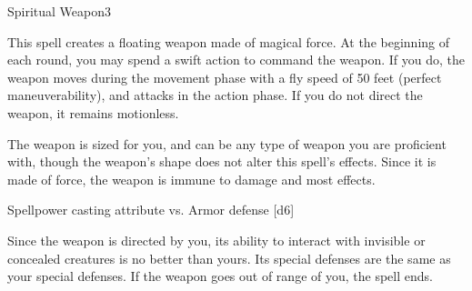 \begin{spellsection}{Spiritual Weapon}{3}
    \begin{spellheader}
    \end{spellheader}
    \begin{spellcontent}
        \begin{spelltargetinginfo}
        \end{spelltargetinginfo}
        \begin{spelleffects}
            \spelleffect This spell creates a floating weapon made of magical force. At the beginning of each round, you may spend a swift action to command the weapon. If you do, the weapon moves during the movement phase with a fly speed of 50 feet (perfect maneuverability), and attacks in the action phase. If you do not direct the weapon, it remains motionless.

            The weapon is sized for you, and can be any type of weapon you are proficient with, though the weapon's shape does not alter this spell's effects. Since it is made of force, the weapon is immune to damage and most effects.
            \spelldur \durshort \dismissable
        \end{spelleffects}
    \end{spellcontent}
    \begin{spellsubcontent}
        \begin{spelltargetinginfo}
        \end{spelltargetinginfo}
        \begin{spelleffects}
            \begin{spellattack}{Spellpower \add casting attribute vs. Armor defense}
                \spellsuccess {}[d6]
            \end{spellattack}
        \end{spelleffects}
    \end{spellsubcontent}
    \begin{spellfooter}
        \spellnotes Since the weapon is directed by you, its ability to interact with invisible or concealed creatures is no better than yours. Its special defenses are the same as your special defenses. If the weapon goes out of range of you, the spell ends.
        \miscastexplode
    \end{spellfooter}
\end{spellsection}

